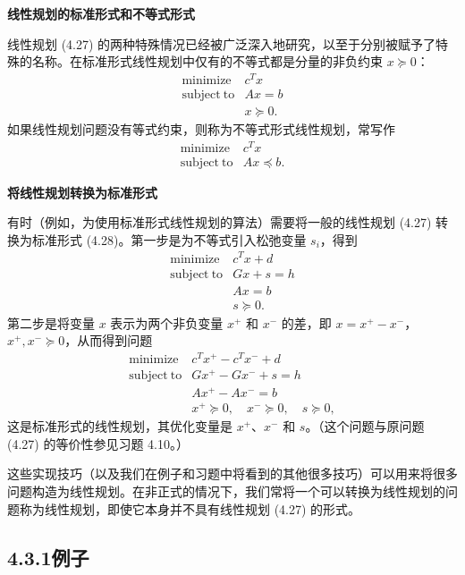 \documentclass[UTF8,12pt,a4paper,fontset=fandol]{ctexart}
\begin{document}
\noindent\textbf{线性规划的标准形式和不等式形式}

线性规划 (4.27) 的两种特殊情况已经被广泛深入地研究，以至于分别被赋予了特殊的名称。在标准形式线性规划中仅有的不等式都是分量的非负约束 $x\succeq 0$：
\begin{equation}
\begin{array}{ll}
\mathop{\mathrm{minimize}} & c^Tx\\
\mathrm{subject\ to} & Ax=b\\
& x\succeq 0.
\end{array}
\tag{4.28}
\end{equation}
如果线性规划问题没有等式约束，则称为不等式形式线性规划，常写作
\begin{equation}
\begin{array}{ll}
\mathop{\mathrm{minimize}} & c^Tx\\
\mathrm{subject\ to} & Ax\preceq b.
\end{array}
\tag{4.29}
\end{equation}

\noindent\textbf{将线性规划转换为标准形式}

有时（例如，为使用标准形式线性规划的算法）需要将一般的线性规划 (4.27) 转换为标准形式 (4.28)。第一步是为不等式引入松弛变量 $s_i$，得到
\[
\begin{array}{ll}
\mathop{\mathrm{minimize}} & c^Tx+d\\
\mathrm{subject\ to} & Gx+s=h\\
& Ax=b\\
& s\succeq 0.
\end{array}
\]
第二步是将变量 $x$ 表示为两个非负变量 $x^+$ 和 $x^-$ 的差，即 $x=x^+-x^-$，$x^+,x^-\succeq 0$，从而得到问题
\[
\begin{array}{ll}
\mathop{\mathrm{minimize}} & c^Tx^+-c^Tx^-+d\\
\mathrm{subject\ to} & Gx^+-Gx^-+s=h\\
& Ax^+-Ax^-=b\\
& x^+\succeq 0,\quad x^-\succeq 0,\quad s\succeq 0,
\end{array}
\]
这是标准形式的线性规划，其优化变量是 $x^+$、$x^-$ 和 $s$。（这个问题与原问题 (4.27) 的等价性参见习题 4.10。）

这些实现技巧（以及我们在例子和习题中将看到的其他很多技巧）可以用来将很多问题构造为线性规划。在非正式的情况下，我们常将一个可以转换为线性规划的问题称为线性规划，即使它本身并不具有线性规划 (4.27) 的形式。

\subsection*{4.3.1\quad 例子}
\end{document}
